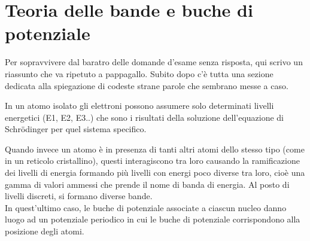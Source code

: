 \section{Teoria delle bande e buche di potenziale}

Per sopravvivere dal baratro delle domande d'esame senza risposta, qui scrivo un riassunto che va ripetuto a pappagallo. Subito dopo c'è tutta una sezione dedicata alla spiegazione di codeste strane parole che sembrano messe a caso.

In un atomo isolato gli elettroni possono assumere solo determinati livelli energetici (E1, E2, E3..) che sono i risultati della soluzione dell'equazione di Schrödinger per quel sistema specifico. 

Quando invece un atomo è in presenza di tanti altri atomi dello stesso tipo (come in un reticolo cristallino), questi interagiscono tra loro causando la ramificazione dei livelli di energia formando più livelli con energi poco diverse tra loro, cioè una gamma di valori ammessi che prende il nome di banda di energia. Al posto di livelli discreti, si formano diverse bande.\\
In quest'ultimo caso, le buche di potenziale associate a ciascun nucleo danno luogo ad un potenziale periodico in cui le buche di potenziale corrispondono alla posizione degli atomi.
